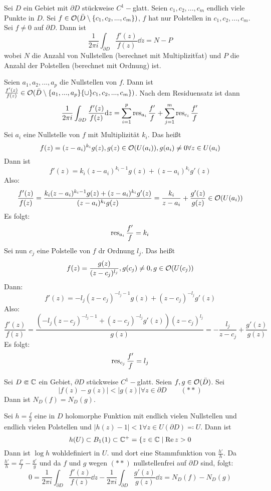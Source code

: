 \begin{satz}
	Sei $ D $ ein Gebiet mit $ \partial D $ st\"uckweise $ C^1- $glatt. Seien $ c_1,c_2,...,c_m $ endlich viele Punkte in $ D $. Sei $ f\in\mathcal O(\bar D\setminus\lbrace c_1,c_2,...,c_m\rbrace) $, $ f $ hat nur Polstellen in $ c_1,c_2,...,c_m $. Sei $ f\neq 0 $ auf $ \partial D $. Dann ist
	\[ \frac{1}{2\pi i}\int_{\partial D}^{}\frac{f'(z)}{f(z)}\dd z=N-P \]
	wobei $ N $ die Anzahl von Nullstellen (berechnet mit Multiplizit\"tat) und $ P $ die Anzahl der Polstellen (berechnet mit Ordnung) ist.
\end{satz}
\begin{beweis}
	Seien $ a_1,a_2,...,a_p $ die Nullstellen von $ f $. Dann ist $ \frac{f'(z)}{f(z)}\in\mathcal O(\bar D\setminus\lbrace a_1,...,a_p\rbrace\lbrace\cup\rbrace  c_1,c_2,...,c_m\rbrace) $. Nach dem Residuensatz ist dann
	\[ \frac{1}{2\pi i}\int_{\partial D}^{}\frac{f'(z)}{f(z)}\mathrm d z=\sum_{i=1}^{p}\operatorname{res}_{a_i}\frac{f'}{f}+\sum_{j=1}^{m}\operatorname{res}_{c_i}\frac{f'}{f} \]
	Sei $ a_i $ eine Nullstelle von $ f $ mit Multiplizit\"at $ k_i $. Das hei\ss t
	\[ f(z)=(z-a_i)^{k_i}g(z), g(z)\in\mathcal O(U(a_i)),  g(a_i)\neq 0\forall z\in U(a_i)  \]
	Dann ist
	\[ f'(z)=k_i(z-a_i)^{k_i-1}g(z)+(z-a_i)^{k_i}g'(z) \]
	Also:
	\[ \frac{f'(z)}{f(z)}=\frac{k_i(z-a_i)^{k_i-1}g(z)+(z-a_i)^{k_i}g'(z)}{(z-a_i)^{k_i}g(z)}=\frac{k_i}{z-a_i}+\frac{g'(z)}{g(z)}\in\mathcal O(U(a_i)) \]
	Es folgt:
	\[ \operatorname{res}_{a_i}\frac{f'}{f}=k_i \]
	Sei nun $ c_j $ eine Polstelle von $ f $ dr Ordnung $ l_j $. Das hei\ss t
	\[ f(z)=\frac{g(z)}{(z-c_j)^{l_j}}, g(c_j)\neq 0, g\in\mathcal O(U(c_j)) \]
	Dann:
	\[ f'(z)=-l_j(z-c_j)^{-l_j-1}g(z)+(z-c_j)^{-l_j}g'(z) \]
	Also:
	\[ \frac{f'(z)}{f(z)}=\frac{(-l_j(z-c_j)^{-l_j-1}+(z-c_j)^{-l_j}g'(z))(z-c_j)^{l_j}}{g(z)}=-\frac{l_j}{z-c_j}+\frac{g'(z)}{g(z)} \]
	Es folgt:
	\[ \operatorname{res}_{c_j}\frac{f'}{f}=l_j \]
\end{beweis}
\begin{satz}
	Sei $ D\Subset\mathbb{C} $ ein Gebiet, $ \partial D $ st\"uckweise $ C^1- $glatt. Seien $ f,g\in\mathcal O(\bar D) $. Sei
	\[ |f(z)-g(z)|<|g(z)|\forall z\in\partial D\qquad(\ast\ast) \]
	Dann ist $ N_D(f)=N_D(g) $.
\end{satz}
\begin{beweis}
	Sei $ h=\frac{f}{g} $ eine in $ D $ holomorphe Funktion mit endlich vielen Nullstellen und endlich vielen Polstellen und $ |h(z)-1|<1\forall z\in U(\partial D)\eqqcolon U $. Dann ist \[ h(U)\subset B_1(1)\subset\mathbb{C}^+=\lbrace z\in\mathbb{C}\mid\operatorname{Re} z>0\]
	Dann ist $ \log h $ wohldefiniert in $ U $.
	 und dort eine Stammfunktion von $ \frac{h'}{h} $. Da $ \frac{h'}{h}=\frac{f'}{f}-\frac{g'}{g} $ und da $ f $ und $ g $ wegen $ (\ast\ast) $ nullstellenfrei auf $ \partial D $ sind, folgt:
	 \[ 0=\frac{1}{2\pi i}\int_{\partial D}^{}\frac{f'(z)}{f(z)}\dd z-\frac{1}{2\pi i}\int_{\partial D}\frac{g'(z)}{g(z)}\dd z=N_D(f)-N_D(g) \]
\end{beweis}
